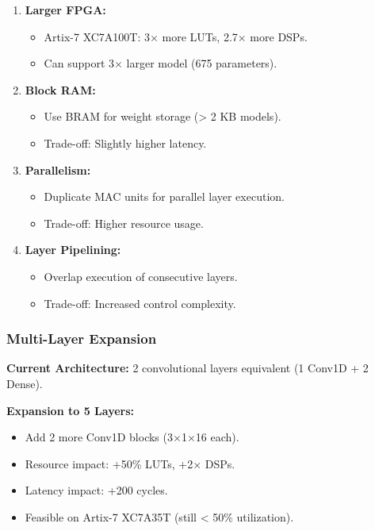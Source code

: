 \documentclass[11pt, a4paper]{article}
\begin{document}
\begin{enumerate}
    \item \textbf{Larger FPGA:}
    \begin{itemize}
        \item Artix-7 XC7A100T: 3$\times$ more LUTs, 2.7$\times$ more DSPs.
        \item Can support 3$\times$ larger model (675 parameters).
    \end{itemize}
    
    \item \textbf{Block RAM:}
    \begin{itemize}
        \item Use BRAM for weight storage (> 2 KB models).
        \item Trade-off: Slightly higher latency.
    \end{itemize}
    
    \item \textbf{Parallelism:}
    \begin{itemize}
        \item Duplicate MAC units for parallel layer execution.
        \item Trade-off: Higher resource usage.
    \end{itemize}
    
    \item \textbf{Layer Pipelining:}
    \begin{itemize}
        \item Overlap execution of consecutive layers.
        \item Trade-off: Increased control complexity.
    \end{itemize}
\end{enumerate}

\subsubsection{Multi-Layer Expansion}

\textbf{Current Architecture:} 2 convolutional layers equivalent (1 Conv1D + 2 Dense).

\textbf{Expansion to 5 Layers:}
\begin{itemize}
    \item Add 2 more Conv1D blocks (3$\times$1$\times$16 each).
    \item Resource impact: +50\% LUTs, +2$\times$ DSPs.
    \item Latency impact: +200 cycles.
    \item Feasible on Artix-7 XC7A35T (still < 50\% utilization).
\end{itemize}
\end{document}
